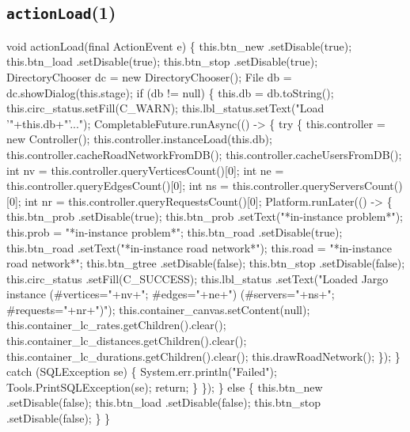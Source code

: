 \subsection{\texttt{actionLoad}(1)}
\nwenddocs{}\endmoddef{}
void actionLoad(final ActionEvent e) \{
  this.btn_new      .setDisable(true);
  this.btn_load     .setDisable(true);
  this.btn_stop     .setDisable(true);
  DirectoryChooser dc = new DirectoryChooser();
  File db = dc.showDialog(this.stage);
  if (db != null) \{
    this.db = db.toString();
    this.circ_status.setFill(C_WARN);
    this.lbl_status.setText("Load '"+this.db+"'...");
    CompletableFuture.runAsync(() -> \{
      try \{
        this.controller = new Controller();
        this.controller.instanceLoad(this.db);
        this.controller.cacheRoadNetworkFromDB();
        this.controller.cacheUsersFromDB();
        int nv = this.controller.queryVerticesCount()[0];
        int ne = this.controller.queryEdgesCount()[0];
        int ns = this.controller.queryServersCount()[0];
        int nr = this.controller.queryRequestsCount()[0];
        Platform.runLater(() -> \{
          this.btn_prob     .setDisable(true);
          this.btn_prob     .setText("*in-instance problem*");
          this.prob = "*in-instance problem*";
          this.btn_road     .setDisable(true);
          this.btn_road     .setText("*in-instance road network*");
          this.road = "*in-instance road network*";
          this.btn_gtree    .setDisable(false);
          this.btn_stop     .setDisable(false);
          this.circ_status  .setFill(C_SUCCESS);
          this.lbl_status   .setText("Loaded Jargo instance (#vertices="+nv+"; #edges="+ne+") (#servers="+ns+"; #requests="+nr+")");
          this.container_canvas.setContent(null);
          this.container_lc_rates.getChildren().clear();
          this.container_lc_distances.getChildren().clear();
          this.container_lc_durations.getChildren().clear();
          this.drawRoadNetwork();
        \});
      \} catch (SQLException se) \{
        System.err.println("Failed");
        Tools.PrintSQLException(se);
        return;
      \}
    \});
  \} else \{
    this.btn_new      .setDisable(false);
    this.btn_load     .setDisable(false);
    this.btn_stop     .setDisable(false);
  \}
\}
\eatline
